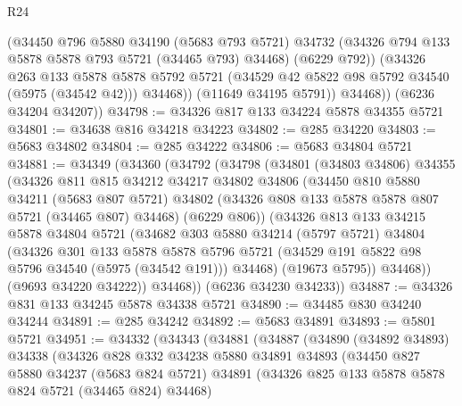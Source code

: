 \begin{lexlean}{R24}
\begin{coremodule}
              (@34450
                @796
                @5880
                @34190
                (@5683 @793 @5721)
                @34732
                (@34326 @794 @133 @5878 @5878 @793 @5721 (@34465 @793) @34468)
                (@6229 @792))
              (@34326
                @263
                @133
                @5878
                @5878
                @5792
                @5721
                (@34529 @42 @5822 @98 @5792 @34540 (@5975 (@34542 @42)))
                @34468))
            (@11649 @34195 @5791))
          @34468))
      (@6236 @34204 @34207))
@34798 := @34326 @817 @133 @34224 @5878 @34355 @5721
@34801 := @34638 @816 @34218 @34223
@34802 := @285 @34220
@34803 := @5683 @34802
@34804 := @285 @34222
@34806 := @5683 @34804 @5721
@34881 := @34349
    (@34360
      (@34792
        (@34798
          (@34801
            (@34803 @34806)
            @34355
            (@34326
              @811
              @815
              @34212
              @34217
              @34802
              @34806
              (@34450
                @810
                @5880
                @34211
                (@5683 @807 @5721)
                @34802
                (@34326 @808 @133 @5878 @5878 @807 @5721 (@34465 @807) @34468)
                (@6229 @806))
              (@34326
                @813
                @133
                @34215
                @5878
                @34804
                @5721
                (@34682
                  @303
                  @5880
                  @34214
                  (@5797 @5721)
                  @34804
                  (@34326
                    @301
                    @133
                    @5878
                    @5878
                    @5796
                    @5721
                    (@34529 @191 @5822 @98 @5796 @34540 (@5975 (@34542 @191)))
                    @34468)
                  (@19673 @5795))
                @34468))
            (@9693 @34220 @34222))
          @34468))
      (@6236 @34230 @34233))
@34887 := @34326 @831 @133 @34245 @5878 @34338 @5721
@34890 := @34485 @830 @34240 @34244
@34891 := @285 @34242
@34892 := @5683 @34891
@34893 := @5801 @5721
@34951 := @34332
    (@34343
      (@34881
        (@34887
          (@34890
            (@34892 @34893)
            @34338
            (@34326
              @828
              @332
              @34238
              @5880
              @34891
              @34893
              (@34450
                @827
                @5880
                @34237
                (@5683 @824 @5721)
                @34891
                (@34326 @825 @133 @5878 @5878 @824 @5721 (@34465 @824) @34468)

\end{coremodule}
\end{lexlean}

